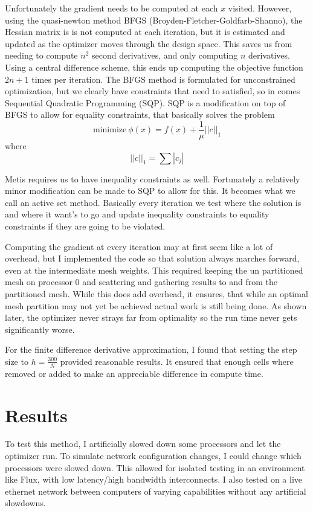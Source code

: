 \documentclass[12pt,parskip=full]{article}
\numberwithin{subsection}{section}
\begin{document}
		Unfortunately the gradient needs to be computed at each $x$ visited. However, using the quasi-newton method BFGS (Broyden-Fletcher-Goldfarb-Shanno),
		the Hessian matrix is is not computed at each iteration, but it is estimated and updated as the optimizer moves through the design space. This saves
		us from needing to compute $n^2$ second derivatives, and only computing $n$ derivatives. Using a central difference scheme, this ends up 
		computing the objective function $2n + 1$ times per iteration. The BFGS method is formulated for unconstrained optimization, but we clearly
		have constraints that need to satisfied, so in comes Sequential Quadratic Programming (SQP). SQP is a modification on top of BFGS to
		allow for equality constraints, that basically solves the problem
		\begin{equation}
			\mathrm{minimize \ } \phi(x) = f(x) + \frac{1}{\mu}||c||_1
		\end{equation}
		where
		\begin{equation}
			||c||_1 = \sum{|c_j|}
		\end{equation}

		Metis requires us to have inequality constraints as well. Fortunately a relatively minor modification can be made to SQP to allow for this.
		It becomes what we call an active set method. Basically every iteration we test where the solution is and where it want's to go and
		update inequality constraints to equality constraints if they are going to be violated.

		Computing the gradient at every iteration may at first seem like a lot of overhead, but I implemented the code so that solution always marches
		forward, even at the intermediate mesh weights. This required keeping the un partitioned mesh on processor 0 and scattering and gathering
		results to and from the partitioned mesh. While this does add overhead, it ensures, that while an optimal mesh partition may not yet be achieved
		actual work is still being done. As shown later, the optimizer never strays far from optimality so the run time never gets significantly worse.
		
		For the finite difference derivative approximation, I found that setting the step size to $h = \frac{300}{N}$ provided reasonable results.
		It ensured that enough cells where removed or added to make an appreciable difference in compute time.

	\section{Results}
		To test this method, I artificially slowed down some processors and let the optimizer run. To simulate network configuration changes, I could
		change which processors were slowed down. This allowed for isolated testing in an environment like Flux, with low latency/high bandwidth interconnects.
		I also tested on a live ethernet network between computers of varying capabilities without any artificial slowdowns.
\end{document}
